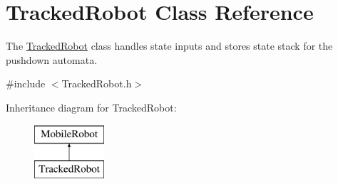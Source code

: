 \hypertarget{class_tracked_robot}{}\section{Tracked\+Robot Class Reference}
\label{class_tracked_robot}


The \mbox{\hyperlink{class_tracked_robot}{Tracked\+Robot}} class handles state inputs and stores state stack for the pushdown automata.  




{\ttfamily \#include $<$Tracked\+Robot.\+h$>$}

Inheritance diagram for Tracked\+Robot\+:\begin{figure}[H]
\begin{center}
\leavevmode
\includegraphics[height=2.000000cm]{class_tracked_robot}
\end{center}
\end{figure}
